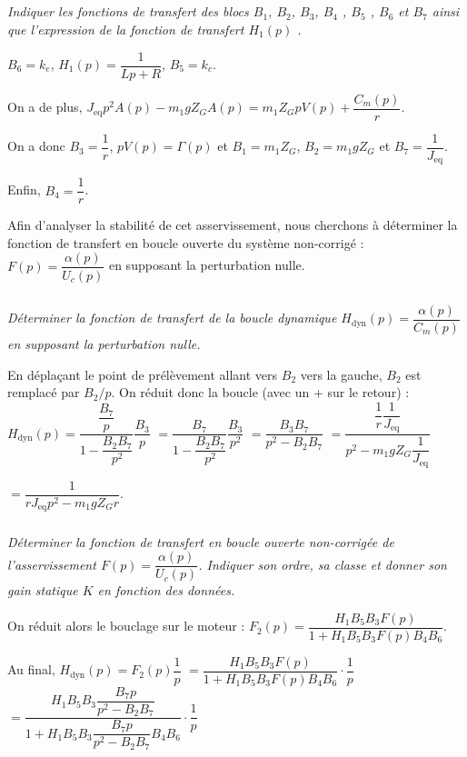 \begin{multicols}{2}
\fi

\subparagraph{} \textit{Indiquer les fonctions de transfert des blocs $B_1$, $B_2$, $B_3$, $B_4$ , $B_5$ , $B_6$ et $B_7$ ainsi que l'expression de la fonction de transfert $H_1(p)$ .}
\ifprof
\begin{corrige}
$B_6 = k_e$, $H_1(p)=\dfrac{1}{Lp + R}$, $B_5 = k_c$. 

On a de plus, $J_{\text{eq}} p^2 A(p) -m_1gZ_GA(p)=m_1 Z_G p V(p) +\dfrac{C_m(p)}{r}$.

On a donc $B_3 = \dfrac{1}{r}$, $p V(p) = \Gamma(p)$ et $B_1 = m_1 Z_G$, $B_2 =m_1gZ_G$ et $B_7 = \dfrac{1}{J_{\text{eq}}}$.

Enfin, $B_4 = \dfrac{1}{r}$.

\end{corrige}
\else
\fi

\ifprof
\else
Afin d'analyser la stabilité de cet asservissement, nous cherchons à déterminer la fonction de transfert en
boucle ouverte du système non-corrigé : $ F(p)= \dfrac{\alpha (p)}{U_c (p)}$ en supposant la perturbation nulle.
\fi

\subparagraph{} \textit{Déterminer la fonction de transfert de la boucle dynamique $H_{\text{dyn}}(p)=\dfrac{\alpha (p)}{C_m(p)}$ en supposant la perturbation nulle.}
\ifprof
\begin{corrige}
En déplaçant le point de prélèvement allant vers $B_2$ vers la gauche, $B_2$ est remplacé par $B_2/p$. On réduit donc la boucle (avec un + sur le retour) : $H_{\text{dyn}}(p)=\dfrac{\dfrac{B_7}{p}}{1-\dfrac{B_2B_7}{p^2}}\dfrac{B_3}{p}$ $=\dfrac{B_7}{1-\dfrac{B_2B_7}{p^2}}\dfrac{B_3}{p^2}$
 $=\dfrac{B_3B_7}{p^2-B_2B_7}$
  $=\dfrac{\dfrac{1}{r}\dfrac{1}{J_{\text{eq}}}}{p^2-m_1gZ_G\dfrac{1}{J_{\text{eq}}}}$
  
    $=\dfrac{1}{r J_{\text{eq}}p^2-m_1gZ_Gr}$.


\end{corrige}
\else
\fi


\subparagraph{} \textit{Déterminer la fonction de transfert en boucle ouverte non-corrigée de l'asservissement $ F(p)= \dfrac{\alpha (p)}{U_c (p)}$.
Indiquer son ordre, sa classe et donner son gain statique $K$ en fonction des données.}
\ifprof
\begin{corrige}

On réduit alors le bouclage sur le moteur : $F_2(p)=\dfrac{H_1B_5B_3 F(p)}{1+H_1B_5B_3 F(p)B_4 B_6}$. 

Au final, $H_{\text{dyn}}(p) = F_2 (p)\dfrac{1}{p}$ $=\dfrac{H_1B_5B_3 F(p)}{1+H_1B_5B_3 F(p)B_4 B_6} \cdot\dfrac{1}{p}$ $=\dfrac{H_1B_5B_3 \dfrac{B_7 p}{p^2-B_2B_7}}{1+H_1B_5B_3 \dfrac{B_7 p}{p^2-B_2B_7}B_4 B_6} \cdot\dfrac{1}{p}$


\end{corrige}
\end{multicols}
